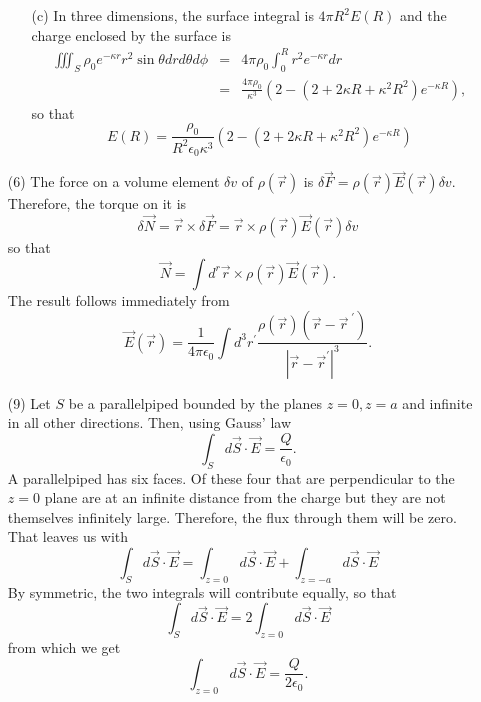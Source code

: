 \documentclass{article}
\newcommand{\op}{\prime}
\newcommand{\ke}{\frac{1}{4\pi\epsilon_0}}
\begin{document}
\begin{enumerate}
\begin{enumerate}
\item[(c)] In three dimensions, the surface integral is $4\pi R^2E(R)$ and the 
charge enclosed by the surface is
\begin{eqnarray*}
\iiint_S \rho_0 e^{-\kappa r}r^2\sin\theta drd\theta d\phi
&=& 4\pi\rho_0 \int_0^R r^2 e^{-\kappa r}dr \\
&=& \frac{4\pi\rho_0}{\kappa^3}\left(2 - (2 + 2\kappa R + \kappa^2R^2)e^{-\kappa R}\right),
\end{eqnarray*}
so that
\[
E(R) = \frac{\rho_0}{R^2\epsilon_0\kappa^3}\left(2 - (2 + 2\kappa R + \kappa^2R^2)e^{-\kappa R}\right)
\]
\end{enumerate}

\item[(6)] The force on a volume element $\delta v$ of $\rho(\vec{r})$ is 
$\delta\vec{F} = \rho(\vec{r})\vec{E}(\vec{r})\delta v$. Therefore, the torque 
on it is
\[
\delta\vec{N} = \vec{r} \times \delta\vec{F} = \vec{r}\times\rho(\vec{r})\vec{E}(\vec{r})\delta v
\]
so that
\[
\vec{N} = \int d^r \vec{r}\times\rho(\vec{r})\vec{E}(\vec{r}).
\]
The result follows immediately from 
\[
\vec{E}(\vec{r}) = \ke\int d^3r^\op \frac{\rho(\vec{r})(\vec{r} - \vec{r}^{\;\op})}{|\vec{r} - \vec{r}^\op|^3}.
\]

\item[(9)] Let $S$ be a parallelpiped bounded by the planes $z = 0, z = a$ and 
infinite in all other directions. Then, using Gauss' law
\[
\int_S d\vec{S}\cdot\vec{E} = \frac{Q}{\epsilon_0}.
\]
A parallelpiped has six faces. Of these four that are perpendicular to the $z = 0$
plane are at an infinite distance from the charge but they are not themselves 
infinitely large. Therefore, the flux through them will be zero. That leaves us 
with
\[
\int_S d\vec{S}\cdot\vec{E} = \int_{z=0} d\vec{S}\cdot\vec{E} + \int_{z=-a}
 d\vec{S}\cdot\vec{E}
\]
By symmetric, the two integrals will contribute equally, so that
\[
\int_S d\vec{S}\cdot\vec{E} = 2\int_{z=0} d\vec{S}\cdot\vec{E}
\]
from which we get
\[
\int_{z=0} d\vec{S}\cdot\vec{E} = \frac{Q}{2\epsilon_0}.
\]



\end{enumerate}
\end{document}
